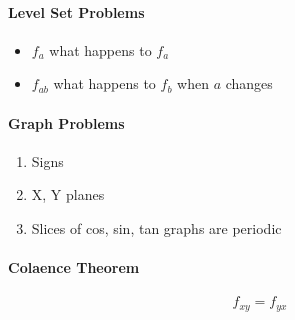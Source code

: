 \documentclass[11pt]{article}
\begin{document}
  \paragraph{Level Set Problems}
  \begin{itemize}
    \item $ f_{a} $ what happens to $ f_{a} $
    \item $ f_{ab} $ what happens to $ f_{b} $ when $ a $ changes
  \end{itemize}

  \paragraph{Graph Problems}
  \begin{enumerate}
    \item Signs
    \item X, Y planes
    \item Slices of cos, sin, tan graphs are periodic
  \end{enumerate}

  \paragraph{Colaence Theorem}
  \begin{equation}
    f_{xy} = f_{yx}
  \end{equation}
\end{document}
